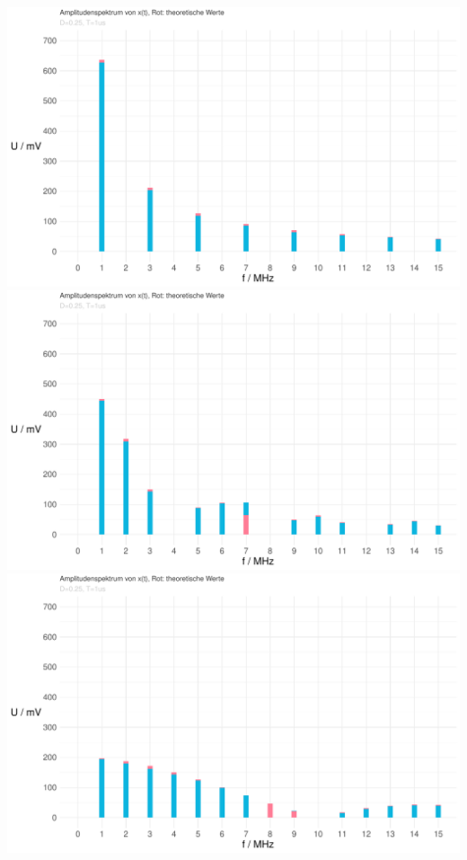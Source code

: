 \documentclass[a4paper, 12pt]{article}
\begin{document}
    \begin{center}
      \includegraphics[scale=0.5]{./R/3_1/3_1_ASpektrum_05_2.pdf}
      \vspace{0.021276873\paperheight}
      \vspace{0.021276873\paperheight}
      \includegraphics[scale=0.5]{./R/3_1/3_1_ASpektrum_025_2.pdf}
      \vspace{0.021276873\paperheight}
      \vspace{0.021276873\paperheight}
      \includegraphics[scale=0.5]{./R/3_1/3_1_ASpektrum_01_2.pdf}
    \end{center}
\end{document}
